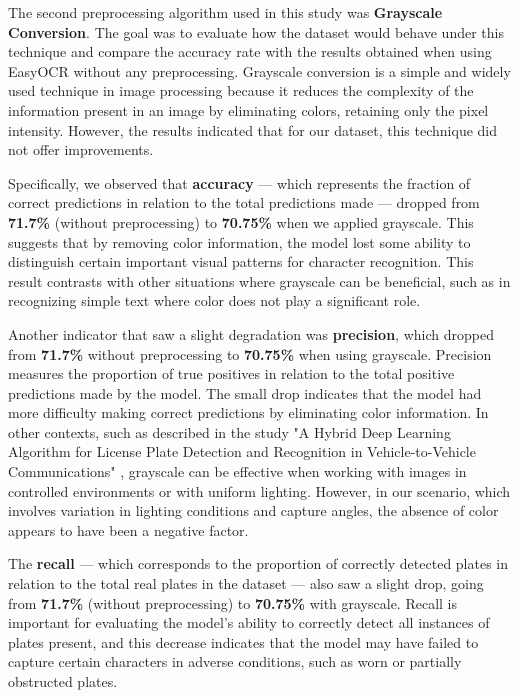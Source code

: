 \documentclass[conference]{IEEEtran}
\begin{document}
	The second preprocessing algorithm used in this study was \textbf{Grayscale Conversion}. The goal was to evaluate how the dataset would behave under this technique and compare the accuracy rate with the results obtained when using EasyOCR without any preprocessing. Grayscale conversion is a simple and widely used technique in image processing because it reduces the complexity of the information present in an image by eliminating colors, retaining only the pixel intensity. However, the results indicated that for our dataset, this technique did not offer improvements.
	
	Specifically, we observed that \textbf{accuracy} — which represents the fraction of correct predictions in relation to the total predictions made — dropped from \textbf{71.7\%} (without preprocessing) to \textbf{70.75\%} when we applied grayscale. This suggests that by removing color information, the model lost some ability to distinguish certain important visual patterns for character recognition. This result contrasts with other situations where grayscale can be beneficial, such as in recognizing simple text where color does not play a significant role.
	
	Another indicator that saw a slight degradation was \textbf{precision}, which dropped from \textbf{71.7\%} without preprocessing to \textbf{70.75\%} when using grayscale. Precision measures the proportion of true positives in relation to the total positive predictions made by the model. The small drop indicates that the model had more difficulty making correct predictions by eliminating color information. In other contexts, such as described in the study "A Hybrid Deep Learning Algorithm for License Plate Detection and Recognition in Vehicle-to-Vehicle Communications" \cite{b7}, grayscale can be effective when working with images in controlled environments or with uniform lighting. However, in our scenario, which involves variation in lighting conditions and capture angles, the absence of color appears to have been a negative factor.
	
	The \textbf{recall} — which corresponds to the proportion of correctly detected plates in relation to the total real plates in the dataset — also saw a slight drop, going from \textbf{71.7\%} (without preprocessing) to \textbf{70.75\%} with grayscale. Recall is important for evaluating the model's ability to correctly detect all instances of plates present, and this decrease indicates that the model may have failed to capture certain characters in adverse conditions, such as worn or partially obstructed plates.
	
\end{document}
